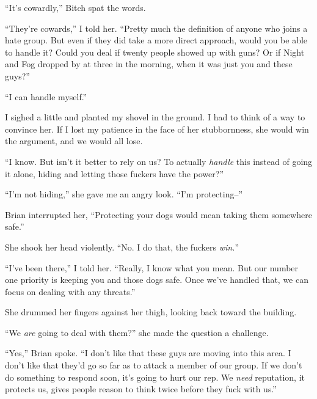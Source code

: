 ``It's cowardly,'' Bitch spat the words.



``They're cowards,'' I told her.  ``Pretty much the definition of anyone who joins a hate group.  But even if they did take a more direct approach, would you be able to handle it?  Could you deal if twenty people showed up with guns?  Or if Night and Fog dropped by at three in the morning, when it was just you and these guys?''



``I can handle myself.''



I sighed a little and planted my shovel in the ground.  I had to think of a way to convince her.  If I lost my patience in the face of her stubbornness, she would win the argument, and we would all lose.



``I know.  But isn't it better to rely on us?  To actually \emph{handle} this instead of going it alone, hiding and letting those fuckers have the power?''



``I'm not hiding,'' she gave me an angry look.  ``I'm protecting--''



Brian interrupted her, ``Protecting your dogs would mean taking them somewhere safe.''



She shook her head violently.  ``No.  I do that, the fuckers \emph{win.}''



``I've been there,'' I told her.  ``Really, I know what you mean.  But our number one priority is keeping you and those dogs safe.  Once we've handled that, we can focus on dealing with any threats.''



She drummed her fingers against her thigh, looking back toward the building.



``We \emph{are} going to deal with them?'' she made the question a challenge.



``Yes,'' Brian spoke.  ``I don't like that these guys are moving into this area.  I don't like that they'd go so far as to attack a member of our group.  If we don't do something to respond soon, it's going to hurt our rep.  We \emph{need} reputation, it protects us, gives people reason to think twice before they fuck with us.''



